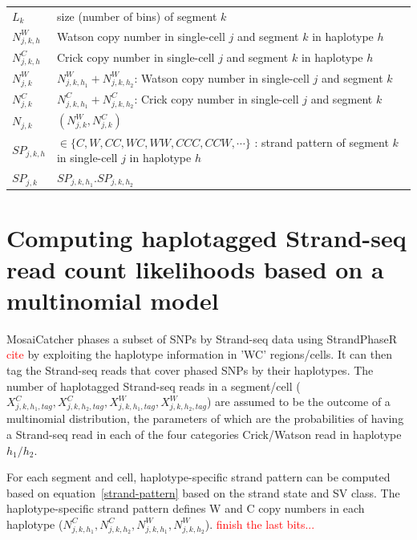 \documentclass[12pt]{article}
\renewcommand{\j}{j} %
\newcommand{\X}{X} %
\renewcommand{\k}{k} %
\newcommand{\h}{h} %
\newcommand{\N}{N} %
\begin{document}
\begin{table}[tb]
\begin{tabular}{  p{4cm} p{12.5cm} }
		$L_\k$ & size (number of bins) of segment $\k$\\
		
		$\N_{\j, \k, \h}^W$ & Watson copy number in single-cell $\j$ and segment $\k$ in haplotype $\h$\\
		
		$\N_{\j, \k, \h}^C$ & Crick copy number in single-cell $\j$ and segment $\k$ in haplotype $\h$\\
		
		$\N_{\j,\k}^W$ & $\N_{\j, \k, \h_1}^W + \N_{\j, \k, \h_2}^W$: Watson copy number in single-cell $\j$ and segment $\k$\\
		
		$\N_{\j,\k}^C$ & $\N_{\j, \k, \h_1}^C + \N_{\j, \k, \h_2}^C$: Crick copy number in single-cell $\j$ and segment $\k$\\
		
		$\N_{\j, \k}$ & $(\N_{\j, \k}^W, \N_{\j, \k}^C)$\\
		
		$SP_{\j,\k, \h}$ & $\in \{C,W,CC,WC,WW,CCC,CCW, \cdots\}$ : strand pattern of segment $\k$ in single-cell $\j$ in haplotype $\h$\\
		
		$SP_{\j,\k}$ & $SP_{\j, \k, \h_1}.SP_{\j, \k, \h_2}$\\
		\hline
	\end{tabular}
	\label{notations}\vspace{-4.5mm}
\end{table}

\section{Computing haplotagged Strand-seq read count likelihoods based on a multinomial model}

MosaiCatcher phases a subset of SNPs by Strand-seq data using StrandPhaseR \textcolor{red}{cite} by exploiting the haplotype information in 'WC' regions/cells.
It can then tag the Strand-seq reads that cover phased SNPs by their haplotypes. The number of haplotagged Strand-seq reads in a segment/cell ($\X^C_{\j,\k,\h_1,tag}, \X^C_{\j,\k,\h_2,tag}, \X^W_{\j,\k,\h_1,tag}, \X^W_{\j,\k,\h_2,tag}$) are assumed to be the outcome of a multinomial distribution, the parameters of which are the probabilities of having a Strand-seq read in each of the four categories Crick/Watson read in haplotype $h_1/h_2$.

For each segment and cell, haplotype-specific strand pattern can be computed based on equation~\ref{strand-pattern} based on the strand state and SV class. The haplotype-specific strand pattern defines W and C copy numbers in each haplotype ($\N^C_{\j,\k,\h_1}, \N^C_{\j,\k,\h_2}, \N^W_{\j,\k,\h_1}, \N^W_{\j,\k,\h_2}$). \textcolor{red}{finish the last bits...}


% 
% 
% 
% 




\end{document}
